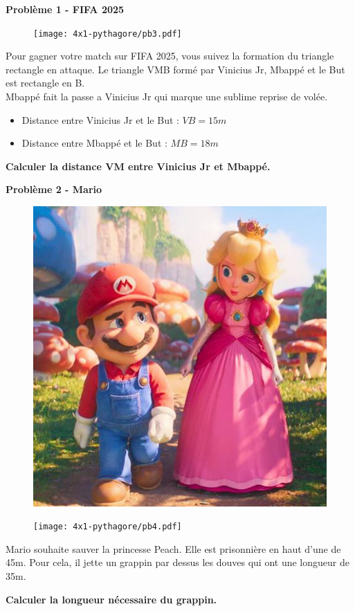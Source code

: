 \textbf{Problème 1 - FIFA 2025} \\

\begin{figure}[H]
  \centering
  \texttt{[image: 4x1-pythagore/pb3.pdf]}
\end{figure}
  
Pour gagner votre match sur FIFA 2025, vous suivez la formation du triangle rectangle en attaque. Le triangle VMB formé par Vinicius Jr, Mbappé et le But est rectangle en B. \\
  
Mbappé fait la passe a Vinicius Jr qui marque une sublime reprise de volée. 
  
\begin{itemize}
  \item Distance entre Vinicius Jr et le But : $VB = 15m$
  \item Distance entre Mbappé et le But : $MB = 18m$
\end{itemize}
  
\textbf{Calculer la distance VM entre Vinicius Jr et Mbappé.} 

\newpage

\begin{multicols}{2} 
  \textbf{Problème 2 - Mario} \\
  
  \begin{figure}[H]
    \centering
    \includegraphics[width=0.3\linewidth]{4x1-pythagore/pb4-mario.png}
  \end{figure}

  \begin{figure}[H]
    \centering
    \texttt{[image: 4x1-pythagore/pb4.pdf]}
  \end{figure}
\end{multicols}

Mario souhaite sauver la princesse Peach. Elle est prisonnière en haut d'une de 45m. Pour cela, il jette un grappin par dessus les douves qui ont une longueur de 35m. 
  
\textbf{Calculer la longueur nécessaire du grappin.} \\


